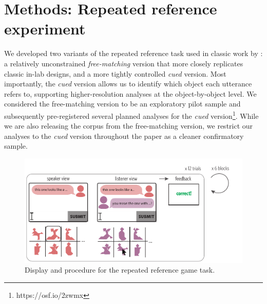 \documentclass[alpha-refs]{wiley-article}
\begin{document}




\section{Methods: Repeated reference experiment}

We developed two variants of the repeated reference task used in classic work by \cite{ClarkWilkesGibbs86_ReferringCollaborative}: a relatively unconstrained \emph{free-matching} version that more closely replicates classic in-lab designs, and a more tightly controlled \emph{cued} version. 
Most importantly, the \emph{cued} version allows us to identify which object each utterance refers to, supporting higher-resolution analyses at the object-by-object level.
We considered the free-matching version to be an exploratory pilot sample and subsequently pre-registered several planned analyses for the \emph{cued} version\footnote{https://osf.io/2zwmx}.
While we are also releasing the corpus from the free-matching version, we restrict our analyses to the \emph{cued} version throughout the paper as a cleaner confirmatory sample.

\begin{figure}
\centering
\vspace{-1em}
\includegraphics[scale=.87]{designAndExample.pdf}
\caption{Display and procedure for the repeated reference game task.}
\label{fig:design}
\end{figure}
\end{document}
